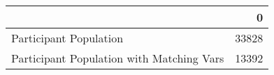 \begin{tabular}{lr}
\toprule
{} &      0 \\
\midrule
Participant Population                    &  33828 \\
Participant Population with Matching Vars &  13392 \\
\bottomrule
\end{tabular}
